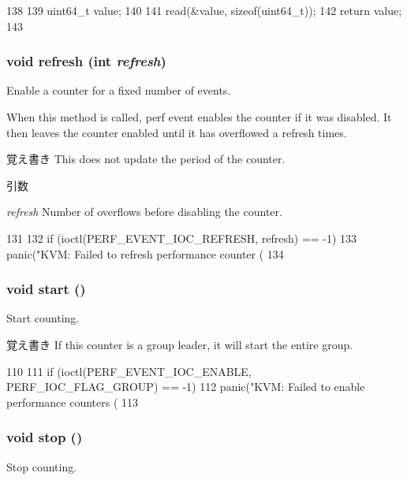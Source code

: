 \begin{DoxyCode}
138 {
139     uint64_t value;
140 
141     read(&value, sizeof(uint64_t));
142     return value;
143 }
\end{DoxyCode}
\hypertarget{classPerfKvmCounter_a6af1a045627841dd5b66f15c28cb48e7}{
\subsubsection[{refresh}]{\setlength{\rightskip}{0pt plus 5cm}void refresh (int {\em refresh})}}
\label{classPerfKvmCounter_a6af1a045627841dd5b66f15c28cb48e7}
Enable a counter for a fixed number of events.

When this method is called, perf event enables the counter if it was disabled. It then leaves the counter enabled until it has overflowed a refresh times.

\begin{DoxyNote}{覚え書き}
This does not update the period of the counter.
\end{DoxyNote}

\begin{DoxyParams}{引数}
\item[{\em refresh}]Number of overflows before disabling the counter. \end{DoxyParams}



\begin{DoxyCode}
131 {
132     if (ioctl(PERF_EVENT_IOC_REFRESH, refresh) == -1)
133         panic("KVM: Failed to refresh performance counter (%
134 }
\end{DoxyCode}
\hypertarget{classPerfKvmCounter_a60de64d75454385b23995437f1d72669}{
\subsubsection[{start}]{\setlength{\rightskip}{0pt plus 5cm}void start ()}}
\label{classPerfKvmCounter_a60de64d75454385b23995437f1d72669}
Start counting.

\begin{DoxyNote}{覚え書き}
If this counter is a group leader, it will start the entire group. 
\end{DoxyNote}



\begin{DoxyCode}
110 {
111     if (ioctl(PERF_EVENT_IOC_ENABLE, PERF_IOC_FLAG_GROUP) == -1)
112         panic("KVM: Failed to enable performance counters (%
113 }
\end{DoxyCode}
\hypertarget{classPerfKvmCounter_a8c528baf37154d347366083f0f816846}{
\subsubsection[{stop}]{\setlength{\rightskip}{0pt plus 5cm}void stop ()}}
\label{classPerfKvmCounter_a8c528baf37154d347366083f0f816846}
Stop counting.

